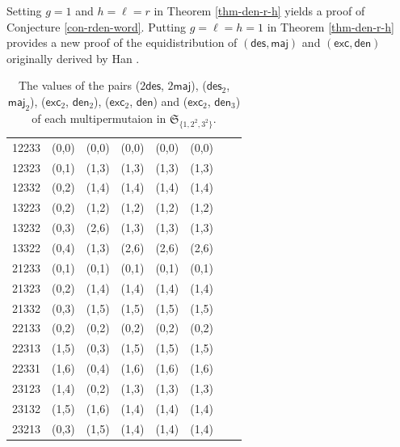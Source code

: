 \documentclass[12pt]{article}
\numberwithin{equation}{section}
\theoremstyle{plain}
\def\des{\mathsf{des}}
\def\maj{\mathsf{maj}}
\def\exc{\mathsf{exc}}
\def\den{\mathsf{den}}
\begin{document}
Setting $g=1$ and $h=\ell=r$ in Theorem \ref{thm-den-r-h} yields  a proof of Conjecture \ref{con-rden-word}.  Putting   $g=\ell=h=1$ in Theorem \ref{thm-den-r-h}  provides  a new proof of the equidistribution of  $(\des, \maj)$ and $(\exc, \den)$ originally derived by Han \cite{Han1}.
 



 
\begin{table}[htb]\label{table1}
	\setlength\tabcolsep{6pt}   
	\begin{center}
		\caption{The values of the pairs ($2\des$, $2\maj$), ($\des_2$, $\maj_2$), ($\exc_2$, $\den_2$), ($\exc_2$, $\den$) and ($\exc_2$, $\den_3$) of each multipermutaion in $\mathfrak{S}_{\{1,2^2,3^2\}}$.}
		\vspace{1em}
		\fontsize{10}{8}\selectfont
		\begin{tabular}{cccccccc}
			\toprule
			\boldmath{$\mathfrak{S}_{\{1, 2^2, 3^2\}}$}& 
			\boldmath{($2\des$, $2\maj$)}&
			\boldmath{($\des_2$, $\maj_2$)}&
			\boldmath{($\exc_2$, $\den_2$)}&
			\boldmath{($\exc_2$, $\den$)}& \boldmath{($\exc_2$, $\den_3$)} \\
			\midrule
			12233 & (0,0) & (0,0) & (0,0) & (0,0) & (0,0)\\
			12323 & (0,1) & (1,3) & (1,3) & (1,3) & (1,3)\\
			12332 &	(0,2) & (1,4) &	(1,4) & (1,4) & (1,4)\\
			13223 &	(0,2) & (1,2) &	(1,2) & (1,2) & (1,2)\\
			13232 &	(0,3) & (2,6) &	(1,3) & (1,3) & (1,3)\\
			13322 &	(0,4) & (1,3) &	(2,6) & (2,6) & (2,6)\\
			21233 &	(0,1) & (0,1) &	(0,1) & (0,1) & (0,1)\\
			21323 &	(0,2) & (1,4) &	(1,4) & (1,4) & (1,4)\\
			21332 &	(0,3) & (1,5) &	(1,5) & (1,5) & (1,5)\\
			22133 &	(0,2) & (0,2) &	(0,2) & (0,2) & (0,2)\\
			22313 &	(1,5) & (0,3) &	(1,5) & (1,5) & (1,5)\\
			22331 &	(1,6) & (0,4) &	(1,6) & (1,6) & (1,6)\\
			23123 &	(1,4) & (0,2) &	(1,3) & (1,3) & (1,3)\\
			23132 &	(1,5) & (1,6) &	(1,4) & (1,4) & (1,4)\\
			23213 &	(0,3) & (1,5) &	(1,4) & (1,4) & (1,4)\\

\end{tabular}
\end{center}
\end{table}
\end{document}
